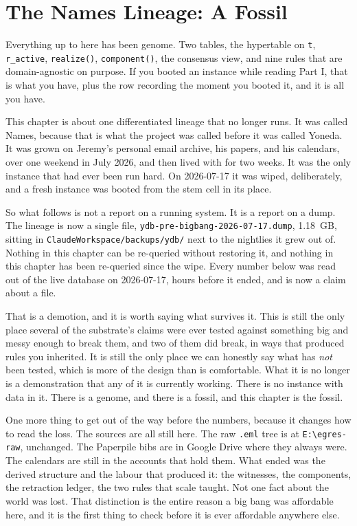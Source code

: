 \chapter{The Names Lineage: A Fossil}

Everything up to here has been genome. Two tables, the hypertable on \texttt{t}, \texttt{r\_active}, \texttt{realize()}, \texttt{component()}, the consensus view, and nine rules that are domain-agnostic on purpose. If you booted an instance while reading Part I, that is what you have, plus the row recording the moment you booted it, and it is all you have.

This chapter is about one differentiated lineage that no longer runs. It was called Names, because that is what the project was called before it was called Yoneda. It was grown on Jeremy's personal email archive, his papers, and his calendars, over one weekend in July 2026, and then lived with for two weeks. It was the only instance that had ever been run hard. On 2026-07-17 it was wiped, deliberately, and a fresh instance was booted from the stem cell in its place.

So what follows is not a report on a running system. It is a report on a dump. The lineage is now a single file, \texttt{ydb-pre-bigbang-2026-07-17\allowbreak.dump}, 1.18~GB, sitting in \texttt{ClaudeWorkspace/\allowbreak backups/ydb/} next to the nightlies it grew out of. Nothing in this chapter can be re-queried without restoring it, and nothing in this chapter has been re-queried since the wipe. Every number below was read out of the live database on 2026-07-17, hours before it ended, and is now a claim about a file.

That is a demotion, and it is worth saying what survives it. This is still the only place several of the substrate's claims were ever tested against something big and messy enough to break them, and two of them did break, in ways that produced rules you inherited. It is still the only place we can honestly say what has \emph{not} been tested, which is more of the design than is comfortable. What it is no longer is a demonstration that any of it is currently working. There is no instance with data in it. There is a genome, and there is a fossil, and this chapter is the fossil.

One more thing to get out of the way before the numbers, because it changes how to read the loss. The sources are all still here. The raw \texttt{.eml} tree is at \texttt{E:\textbackslash egres-raw}, unchanged. The Paperpile bibs are in Google Drive where they always were. The calendars are still in the accounts that hold them. What ended was the derived structure and the labour that produced it: the witnesses, the components, the retraction ledger, the two rules that scale taught. Not one fact about the world was lost. That distinction is the entire reason a big bang was affordable here, and it is the first thing to check before it is ever affordable anywhere else.

